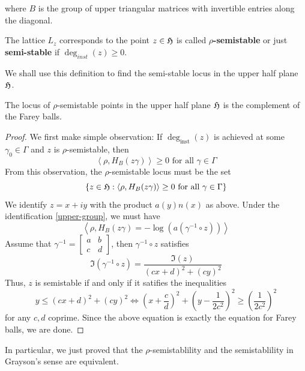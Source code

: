 where $B$ is the group of upper triangular matrices with invertible entries along the diagonal. 
\begin{definition}
  The lattice $L_z$ corresponds to the point $z \in \operatorname{\mathfrak{H}}$ is called \textbf{$\rho$-semistable} or just \textbf{semi-stable}
  if $\deg_{inst}(z) \ge 0$.
\end{definition}
We shall use this definition to find the semi-stable locus in the upper half plane $\operatorname{\mathfrak{H}}$. 
\begin{prop}
  The locus of $\rho$-semistable points in the upper half plane $\operatorname{\mathfrak{H}}$ is the 
  complement of the Farey balls. 
\end{prop}
\begin{proof}
  We first make simple observation: If $\deg_{\text{inst}}(z)$ is achieved at some 
  $\gamma_0 \in \Gamma$ and $z$ is $\rho$-semistable, then 
  \[\left\langle \rho, H_B(z\gamma)\right\rangle \ge 0 \mbox{ for all } \gamma \in \Gamma\]
  From this observation, the $\rho$-semistable locus must be the set 
  \[ \left\lbrace z \in \operatorname{\mathfrak{H}}: \left\langle \rho, H_B(z\gamma)\right\rangle \ge 0 \mbox{ for all } \gamma \in \Gamma \right\rbrace\]
We identify $z=x+iy$ with the product $a(y)n(x)$ as above. Under the identification \ref{upper-group}, we must have 
\[\left\langle \rho, H_B(z\gamma) = -\log(a(\gamma^{-1} \circ z)) \right\rangle\]
Assume that $\gamma^{-1} = 
\begin{bmatrix}
  a & b\\
  c & d
\end{bmatrix}$, then $\gamma^{-1} \circ z$ satisfies
\[\Im(\gamma^{-1}\circ z) = \dfrac{\Im(z)}{(cx+d)^2+(cy)^2}\]
Thus, $z$ is semistable if and only if it satifies the inequalities
\[y \le(cx+d)^2+(cy)^2  \Leftrightarrow \left(x+\dfrac{c}{d}\right)^2+\left(y-\dfrac{1}{2c^2}\right)^2 \ge \left(\dfrac{1}{2c^2}\right)^2 \]
for any $c,d$ coprime. Since the above equation is exactly the equation for Farey balls, we are done.
\end{proof}
In particular, we just proved that the $\rho$-semistablility and the semistablility in Grayson's sense 
are equivalent. 
